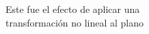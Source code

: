 \documentclass[preview]{standalone}
\begin{document}
\begin{center}
Este fue el efecto de aplicar una \\ transformación no lineal al plano
\end{center}
\end{document}
